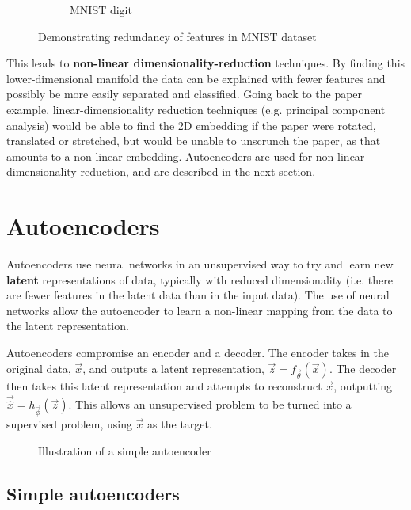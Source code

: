 \begin{figure}[H]
\begin{subfigure}[b]{0.4\linewidth}
    \caption{MNIST digit}
  \end{subfigure}
  \caption{Demonstrating redundancy of features in MNIST dataset}
  \label{fig:digit}
\end{figure}

This leads to \textbf{non-linear dimensionality-reduction} techniques. By finding this lower-dimensional
manifold the data can be explained with fewer features and possibly be more easily separated and classified. Going back to the paper example,
linear-dimensionality reduction techniques (e.g. principal component analysis) would be able to find the 2D embedding if the paper were 
rotated, translated or stretched, but would be unable to unscrunch the paper, as that amounts to a non-linear embedding. Autoencoders are 
used for non-linear dimensionality reduction, and are described in the next section.

\section{Autoencoders}

Autoencoders use neural networks in an unsupervised way to try and learn new \textbf{latent} representations of data, typically with reduced 
dimensionality (i.e. there are fewer features in the latent data than in the input data). The use of neural networks allow the autoencoder 
to learn a 
non-linear mapping from the data to the latent representation.

Autoencoders compromise an encoder and a decoder. The encoder takes in the original data, $\vec{x}$, 
and outputs a latent representation, $\vec{z} = f_{\vec{\theta}}(\vec{x})$. The decoder then takes this latent representation and 
attempts to reconstruct $\vec{x}$, outputting $\vec{\hat{x}} = h_{\vec{\phi}}(\vec{z})$. This allows an unsupervised problem to be turned 
into a supervised problem, using $\vec{x}$ as the target.
\begin{figure}[H]
  \begin{center}
      \scalebox{.6}{}
      \caption{Illustration of a simple autoencoder}
      \label{fig:illustration_autoencoder}
  \end{center}
\end{figure}

\subsection{Simple autoencoders}

